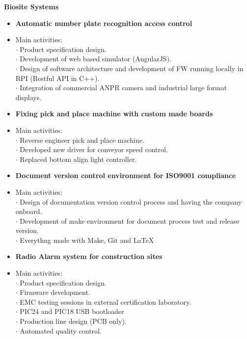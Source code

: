 \documentclass[9pt]{extarticle}
\begin{document}
\textbf{Biosite Systems}\\
\begin{itemize}
\item[\textbf{}]{\textbf{Automatic number plate recognition access control}}
\item[\textbf{}]{Main activities:}\\
$\cdot${ Product specification design.}\\
$\cdot${ Development of web based simulator (AngularJS).}\\
$\cdot${ Design of software architecture and development of FW running locally in RPI (Restful API in C++).}\\
$\cdot${ Integration of commercial ANPR camera and industrial large format displays.}\\
\end{itemize}

\begin{itemize}
\item[\textbf{}]{\textbf{Fixing pick and place machine with custom made boards}}
\item[\textbf{}]{Main activities:}\\
$\cdot${ Reverse engineer pick and place machine.}\\
$\cdot${ Developed new driver for conveyor speed control.}\\
$\cdot${ Replaced bottom align light controller.}\\
\end{itemize}

\begin{itemize}
\item[\textbf{}]{\textbf{Document version control environment for ISO9001 compliance}}
\item[\textbf{}]{Main activities:}\\
$\cdot${ Design of documentation version control process and having the company onboard.}\\
$\cdot${ Development of make environment for document process test and release version.}\\
$\cdot${ Everythng made with Make, Git and \LaTeX}\\
\end{itemize}

\begin{itemize}
\item[\textbf{}]{\textbf{Radio Alarm system for construction sites}}
\item[\textbf{}]{Main activities:}\\
$\cdot${ Product specification design.}\\
$\cdot${ Firmware development.}\\
$\cdot${ EMC testing sessions in external certification laboratory.}\\
$\cdot${ PIC24 and PIC18 USB bootloader}\\
$\cdot${ Production line design (PCB only).}\\
$\cdot${ Automated quality control.}\\
\end{itemize}
\end{document}
